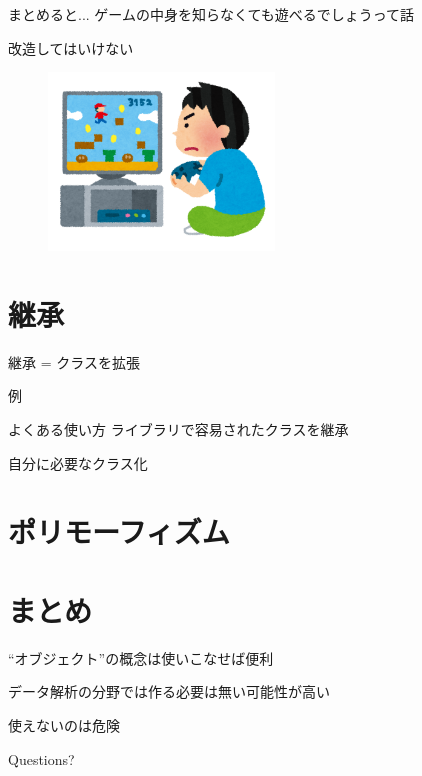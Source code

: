 \documentclass[12pt, xetex, xcolor=pdftex, dvipsnames]{beamer}
\begin{document}
\begin{frame}{まとめると...}
    ゲームの中身を知らなくても遊べるでしょうって話

    改造してはいけない
    \begin{figure}
        \centering
        \includegraphics[width=6cm]{./img/videogame_boy.png}
    \end{figure}
\end{frame}

\section{継承}
{
    \begin{frame}{継承 = クラスを拡張}
    \end{frame}
}
\begin{frame}[fragile]{例}
    
\end{frame}
\begin{frame}{よくある使い方}
    ライブラリで容易されたクラスを継承

    自分に必要なクラス化
\end{frame}

\section{ポリモーフィズム}

\section{まとめ}
\begin{frame}
    ``オブジェクト''の概念は使いこなせば便利

    データ解析の分野では作る必要は無い可能性が高い

    使えないのは危険
\end{frame}
\begin{frame}[standout]
  Questions?
\end{frame}
\end{document}
